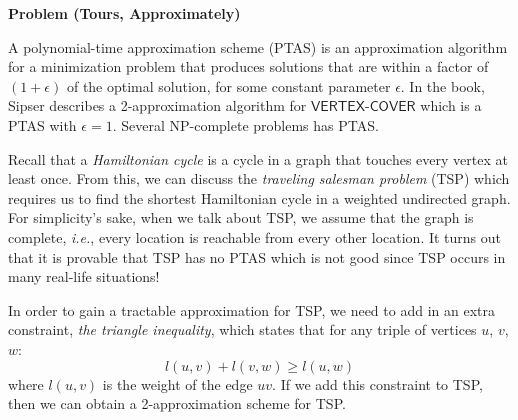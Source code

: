 \documentclass[12pt]{article}
\newcommand{\ie}{\emph{i.e.}\xspace}
\newcounter{ProblemCounter}
\newenvironment{problem}[1][]
  {\refstepcounter{ProblemCounter}\noindent\textbf{Problem \theProblemCounter{} (#1)}\quad}
  {\newpage}
\newcommand{\prob}[1]{\ensuremath{\textsf{#1}}\xspace}
\begin{document}
\begin{problem}[Tours, Approximately]

A polynomial-time approximation scheme (PTAS) is an approximation algorithm for
a minimization problem that produces solutions that are within a factor of \(
(1 + \epsilon) \) of the optimal solution, for some constant parameter \(
\epsilon \).  In the book, Sipser describes a 2-approximation algorithm for
\prob{VERTEX-COVER} which is a PTAS with \( \epsilon = 1 \).  Several
NP-complete problems has PTAS.

Recall that a \emph{Hamiltonian cycle} is a cycle in a graph that touches every
vertex at least once.  From this, we can discuss the \emph{traveling salesman
problem} (TSP) which requires us to find the shortest Hamiltonian cycle in a
weighted undirected graph.  For simplicity's sake, when we talk about TSP, we
assume that the graph is complete, \ie, every location is reachable from every
other location.  It turns out that it is provable that TSP has no PTAS which is
not good since TSP occurs in many real-life situations!

In order to gain a tractable approximation for TSP, we need to add in
an extra constraint, \emph{the triangle inequality}, which states that for any
triple of vertices \( u \), \( v \), \( w \):
\[
  l(u, v) + l(v, w) \geq l(u, w)
\]
where \( l(u, v) \) is the weight of the edge \( uv \).  If we add this constraint
to TSP, then we can obtain a 2-approximation scheme for TSP.


\end{problem}
\end{document}

